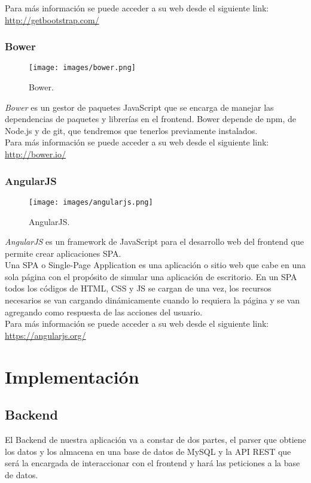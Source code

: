 Para más información se puede acceder a su web desde el siguiente link:\\ \url{http://getbootstrap.com/}

\subsubsection*{Bower}
\begin{figure}[H]
	\centering
	\texttt{[image: images/bower.png]}
	\caption{Bower.}
\end{figure}
\textit{Bower} es un gestor de paquetes JavaScript que se encarga de manejar las
dependencias de paquetes y librerías en el frontend. Bower depende de npm, de Node.js y de git, que tendremos que tenerlos previamente instalados.\\  

Para más información se puede acceder a su web desde el siguiente link:\\ \url{http://bower.io/}

\subsubsection*{AngularJS}
\begin{figure}[H]
	\centering
	\texttt{[image: images/angularjs.png]}
	\caption{AngularJS.}
\end{figure}
\textit{AngularJS} es un framework de JavaScript para el desarrollo web del frontend que permite crear aplicaciones SPA.\\

Una SPA o Single-Page Application es una aplicación o sitio web que cabe en una sola página con el propósito de simular una aplicación de escritorio. En un SPA todos los códigos de HTML, CSS y JS se cargan de una vez, los recursos necesarios se van cargando dinámicamente cuando lo requiera la página y se van agregando como respuesta de las acciones del usuario.\\  

Para más información se puede acceder a su web desde el siguiente link:\\ \url{https://angularjs.org/}

\section{Implementación}

\subsection{Backend}
El Backend de nuestra aplicación va a constar de dos partes, el parser que obtiene los datos y los almacena en una base de datos de MySQL y la API REST que será la encargada de interaccionar con el frontend y hará las peticiones a la base de datos.\\


